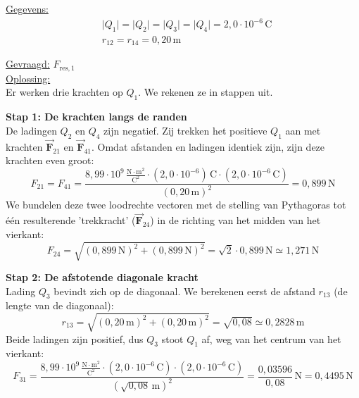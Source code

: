 \documentclass{ximera}
\begin{document}
\begin{exercise}
\begin{question}
        \begin{solution}\nl
            \underline{Gegevens:}
            \begin{align*}
                & \lvert Q_{1} \rvert = \lvert Q_{2} \rvert = \lvert Q_{3} \rvert = \lvert Q_{4} \rvert = 2{,}0 \cdot 10^{-6} \, \mathrm{C} \\
                & r_{12} = r_{14} = 0{,}20 \, \mathrm{m}
            \end{align*}
    
            \underline{Gevraagd:} $F_{\text{res},1}$\\ 
    
            \underline{Oplossing:}\\
            Er werken drie krachten op $Q_1$. We rekenen ze in stappen uit.
            
            \textbf{Stap 1: De krachten langs de randen}\\
            De ladingen $Q_2$ en $Q_4$ zijn negatief. Zij trekken het positieve $Q_1$ aan met krachten $\vec{\mathbf{F}}_{21}$ en $\vec{\mathbf{F}}_{41}$. Omdat afstanden en ladingen identiek zijn, zijn deze krachten even groot:
            \[
                F_{21} = F_{41} = \frac{8{,}99  \cdot 10^9 \, \mathrm{\frac{N \cdot m^2}{C^2}}\cdot (2{,}0 \cdot 10^{-6})\,\mathrm{C} \cdot (2{,}0 \cdot 10^{-6}\,\mathrm{C})}{(0{,}20\,\mathrm{m})^2} = 0{,}899 \, \mathrm{N}
            \]
            We bundelen deze twee loodrechte vectoren met de stelling van Pythagoras tot één resulterende 'trekkracht' ($\vec{\mathbf{F}}_{24}$) in de richting van het midden van het vierkant:
            \[
                F_{24} = \sqrt{(0{,}899\,\mathrm{N})^2 + (0{,}899\,\mathrm{N})^2} = \sqrt{2} \cdot 0{,}899\,\mathrm{N} \simeq 1{,}271 \, \mathrm{N}
            \]
            
            \textbf{Stap 2: De afstotende diagonale kracht}\\
            Lading $Q_3$ bevindt zich op de diagonaal. We berekenen eerst de afstand $r_{13}$ (de lengte van de diagonaal):
            \[
                r_{13} = \sqrt{(0{,}20\,\mathrm{m})^2 + (0{,}20\,\mathrm{m})^2} = \sqrt{0{,}08} \simeq 0{,}2828 \, \mathrm{m}
            \]
            Beide ladingen zijn positief, dus $Q_3$ stoot $Q_1$ af, weg van het centrum van het vierkant:
            \[
                F_{31} = \frac{8{,}99 \cdot 10^9\, \mathrm{\frac{N \cdot m^2}{C^2}} \cdot (2{,}0 \cdot 10^{-6}\,\mathrm{C}) \cdot (2{,}0 \cdot 10^{-6}\,\mathrm{C})}{(\sqrt{0{,}08}\,\mathrm{m})^2} = \frac{0{,}03596}{0{,}08}\,\mathrm{N} = 0{,}4495 \, \mathrm{N}
            \]


\end{solution}
\end{question}
\end{exercise}
\end{document}
